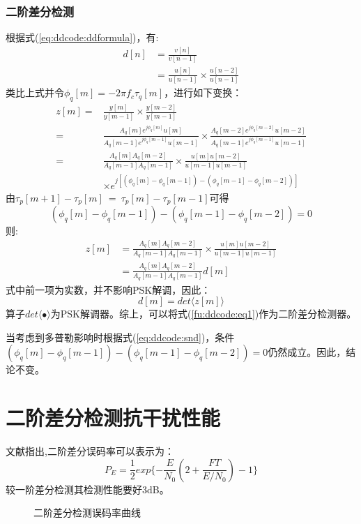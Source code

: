 \subsubsection{二阶差分检测}
	根据式(\ref{eq:ddcode:ddformula})，有:
\begin{equation}
\begin{split}
	d[n]&=\frac{v[n]}{v[n-1]} \\
	    &=\frac{u[n]}{u[n-1]}\times\frac{u[n-2]}{u[n-1]}
\end{split}
\end{equation}
类比上式并令$\phi_q[m]=-2\pi f_c \tau_q[m]$，进行如下变换：
\begin{equation}
\label{fu:ddcode:eq1}
\begin{split}
	z[m]=&\frac{y[m]}{y[m-1]}\times\frac{y[m-2]}{y[m-1]} \\
	=&\frac{A_q[m]e^{j\phi_q[m]} u[m]}{A_q[m-1]e^{j\phi_q[m-1]} u[m-1]} \times \frac{A_q[m-2]e^{j\phi_q[m-2]} u[m-2]}{A_q[m-1]e^{j\phi_q[m-1]} u[m-1]} \\
	=&\frac{A_q[m]A_q[m-2]}{A_q[m-1]A_q[m-1]}\times\frac{u[m]u[m-2]}{u[m-1]u[m-1]} \\
	&\times e^{j\left[(\phi_q[m]-\phi_q[m-1]) - (\phi_q[m-1] - \phi_q[m-2])\right]}
\end{split}
\end{equation}
由$\tau_p[m+1] -\tau_p[m]~=~\tau_p[m]-\tau_p[m-1]$可得\[ (\phi_q[m]-\phi_q[m-1]) - (\phi_q[m-1] - \phi_q[m-2]) = 0 \]则:
\begin{equation}
\begin{split}
z[m]&=\frac{A_q[m]A_q[m-2]}{A_q[m-1]A_q[m-1]}\times\frac{u[m]u[m-2]}{u[m-1]u[m-1]} \\
    &=\frac{A_q[m]A_q[m-2]}{A_q[m-1]A_q[m-1]}d[m]
\end{split}
\end{equation}
式中前一项为实数，并不影响PSK解调，因此：
\begin{equation}
d[m]=det \langle z[m] \rangle
\end{equation}
算子$det\langle \bullet \rangle$为PSK解调器。综上，可以将式(\ref{fu:ddcode:eq1})作为二阶差分检测器。

当考虑到多普勒影响时根据式(\ref{eq:ddcode:snd})，条件$(\phi_q[m]-\phi_q[m-1]) - (\phi_q[m-1] - \phi_q[m-2]) = 0$仍然成立。因此，结论不变。

\section{二阶差分检测抗干扰性能}
文献\cite{simon1992implementation}指出,二阶差分误码率可以表示为：
\begin{equation}
P_E=\frac{1}{2}exp\{ -\frac{E}{N_0}\left( 2+\frac{FT}{E/N_0}\right)^{}-1\}
\end{equation}
较一阶差分检测其检测性能要好3dB。
\begin{figure}[!htbp]
	\centering
	
	\caption{二阶差分检测误码率曲线}
	\label{fig:ddcode:pe}
\end{figure}
